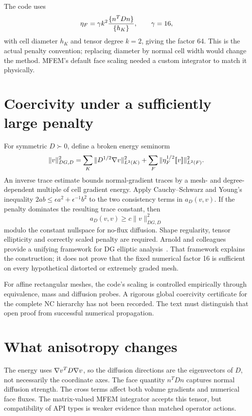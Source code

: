 The code uses
\begin{equation}\label{eq:penalty}
\eta_F=\gamma k^2\frac{\{n^TDn\}}{\{h_K\}},\qquad\gamma=16,
\end{equation}
with cell diameter $h_K$ and tensor degree $k=2$, giving the factor 64. This is the actual penalty convention; replacing diameter by normal cell width would change the method. MFEM's default face scaling needed a custom integrator to match it physically.

\section{Coercivity under a sufficiently large penalty}
For symmetric $D\succ0$, define a broken energy seminorm
\begin{equation}
\|v\|_{DG,D}^2=\sum_K\|D^{1/2}\nabla v\|_{L^2(K)}^2+\sum_F\|\eta_F^{1/2}[\![v]\!]\|_{L^2(F)}^2.
\end{equation}
An inverse trace estimate bounds normal-gradient traces by a mesh- and degree-dependent multiple of cell gradient energy. Apply Cauchy--Schwarz and Young's inequality $2ab\le\epsilon a^2+\epsilon^{-1}b^2$ to the two consistency terms in $a_D(v,v)$. If the penalty dominates the resulting trace constant, then
\begin{equation}
a_D(v,v)\ge c\|v\|_{DG,D}^2
\end{equation}
modulo the constant nullspace for no-flux diffusion. Shape regularity, tensor ellipticity and correctly scaled penalty are required. Arnold and colleagues provide a unifying framework for DG elliptic analysis~\cite{arnold}. That framework explains the construction; it does not prove that the fixed numerical factor 16 is sufficient on every hypothetical distorted or extremely graded mesh.

For affine rectangular meshes, the code's scaling is controlled empirically through equivalence, mass and diffusion probes. A rigorous global coercivity certificate for the complete NC hierarchy has not been recorded. The text must distinguish that open proof from successful numerical propagation.

\section{What anisotropy changes}
The energy uses $\nabla v^TD\nabla v$, so the diffusion directions are the eigenvectors of $D$, not necessarily the coordinate axes. The face quantity $n^TDn$ captures normal diffusion strength. The cross terms affect both volume gradients and numerical face fluxes. The matrix-valued MFEM integrator accepts this tensor, but compatibility of API types is weaker evidence than matched operator actions.

